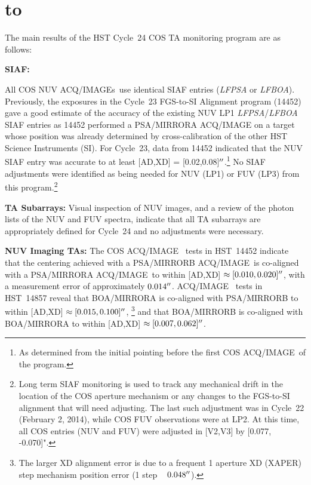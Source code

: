 \documentclass[12pt]{reportj}
\def\arcsec{\hbox{$^{\prime\prime}$}}
\newcommand*{\myfont}{\fontfamily{rm}\selectfont}
\def\acqimage{{\myfont ACQ/IMAGE}\rm}
\def\acqimages{{\myfont ACQ/IMAGE{\rm s}}\rm}
\def\ssection#1{\addtocounter{section}{1} \setcounter{subsection}{0} \section*{\hbox to \hsize{\large\bf \arabic{section}. #1\hfill }}}
\begin{document}
\clearpage
\vspace{-0.1cm}
\ssection{Results\label{sec:results}}
The main results of the HST Cycle~24 COS TA monitoring program are as follows:
\begin{description}
\item{\bf SIAF:}{
	All COS NUV \acqimages~use identical SIAF entries ({\it LFPSA} or {\it LFBOA}).
	Previously, the exposures in the Cycle~23 FGS-to-SI Alignment program (14452) gave a good estimate of the accuracy of the existing NUV LP1 {\it LFPSA}/{\it LFBOA} SIAF entries
	as 14452 performed a PSA/MIRRORA ACQ/IMAGE on a target whose position was already determined by cross-calibration of the other HST Science Instruments (SI).
	For Cycle~23, data from 14452 indicated that the NUV SIAF entry was accurate to at least [AD,XD] = [0.02,0.08]$\arcsec$.\footnote{As determined from the initial pointing before the first COS \acqimage~of the program.}
	No SIAF adjustments were identified as being needed for NUV (LP1) or FUV (LP3) from this program.\footnote{Long term SIAF monitoring is used to track any mechanical drift in the location of the COS aperture mechanism or any changes to the FGS-to-SI alignment that will need adjusting.
	The last such adjustment was in Cycle~22 (February 2, 2014), while COS FUV observations were at LP2. At this time, all COS entries (NUV and FUV) were adjusted in [V2,V3] by [0.077, -0.070]". }

}
\item{\bf TA Subarrays:} Visual inspection of NUV images, and a review of the photon lists of the NUV and FUV spectra, indicate that all TA subarrays are appropriately defined for Cycle~24 and no adjustments were necessary.
\item{\bf NUV Imaging TAs:}
	The COS \acqimage~ tests in HST~14452 indicate that the centering achieved with a PSA/MIRRORB \acqimage~is co-aligned with a PSA/MIRRORA \acqimage~to within [AD,XD] $\approx [0.010,0.020]\arcsec$, with a measurement error of approximately $0.014\arcsec$.
	\acqimage~ tests in HST~14857 reveal that BOA/MIRRORA is co-aligned with PSA/MIRRORB to within [AD,XD] $\approx [0.015,0.100]\arcsec$,
	\footnote{The larger XD alignment error is due to a frequent 1 aperture XD (XAPER) step mechanism position error (1 step ~ $0.048\arcsec$).}
	and that BOA/MIRRORB is co-aligned with BOA/MIRRORA to within [AD,XD] $\approx [0.007,0.062]\arcsec$.


\end{description}
\end{document}
